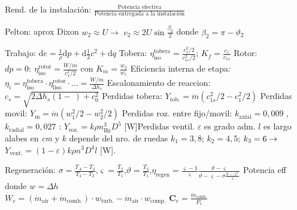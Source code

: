\newcommand{\rTc}{\varsigma}
\newcommand{\rTt}{\vartheta}
\newcommand{\Ce}{\mathbf{C}_e}

\begin{formuleo}[Turbinas]
Rend. de la instalación: $\frac{\text{Potencia efectiva}}{\text{Potencia entregada a la instalación}}$

\end{formuleo}

\begin{formuleo}[T. Hidráulicas]
Pelton: aprox Dixon $w_2\approx U\rightarrow$ $c_2 \approx 2 U \sin \frac{\beta_2}{2}$ donde $\beta_{2}=\pi-\vartheta_{2}$ \
\end{formuleo}

\begin{formuleo}[T. de Vapor]
Trabajo: $\mathrm{d} e=\frac{1}{\rho} \mathrm{d} p+\mathrm{d} \frac{1}{2} c^{2}+\mathrm{d} q$\separar
Tobera: $\eta_{\mathrm{iso}}^{\mathrm{tobera}}=\frac{c_{1}^{2} / 2}{c_{1 s}^{2} / 2}$; $K_{f}=\frac{c_{1}}{c_{1 s}}$ \separar 
Rotor: $dp=0:\ \eta_{\mathrm{iso}}^{\mathrm{rotor}}=\frac{\dot{W} / \dot{m}}{c_{1}^{2} / 2}$ con $K_{m}=\frac{w_{2}}{w_{1}}$ \separar Eficiencia interna de etapa: $\eta_{i}=\eta_{\mathrm{iso}}^{\mathrm{tobera}} \cdot \eta_{\mathrm{liso}}^{\mathrm{rotor}} \cdot \ldots=\frac{W / \dot{m}}{\Delta h_{s}}$ \separar Escalonamiento de reaccion: $c_{s}=\sqrt{2 \Delta h_{s}(1-\ )+c_{0}^{2}}$  \separar Perdidas tobera: $Y_{\mathrm{tob.}}=\dot{m}(c^2_{1s}/2-c^2_1/2)$  Perdidas movil: $Y_{\mathrm{m}} = \dot{m}(w_1^2/2 - w_2^2/2)$
Perdidas roz. entre fijo/movil: $k_{\mathrm{axial}}=0,009$ ,$k_{\mathrm{radial}}=0,027$ : $Y_{\mathrm{roz.}}=k \rho n_{\mathrm{Hz}}^{3} D^{5}$ [W]\separar Perdidas ventil. $\varepsilon$ es grado adm. $l$ es largo alabes en \emph{cm} y $k$ depende del nro. de ruedas $k_1=3,8$; $k_2=4,5$; $k_3=6 \rightarrow $ $Y_{\mathrm{vent.}}=(1-\varepsilon) k \rho n^{3} D^{4} l$ [W].
\end{formuleo}

\begin{formuleo}[T.Gas]
Regeneración: $\sigma=\frac{T_A-T_2}{T_4 - T_2}$,$\rTc = \frac{T_2}{T_1}$,$\rTt=\frac{T_3}{T_1}$,$\eta_{\mathrm{regen}} = \frac{\rTc  -1}{\rTc} \frac{\rTt-\rTc}{\rTt -\rTc - \sigma \frac{\rTt - \rTc^2}{\rTc}} $ \separar Potencia eff donde $w=\Delta h$\\ $\dot{W}_{e}=\left(\dot{m}_{\mathrm{air}}+\dot{m}_{\mathrm{comb.}}\right) \cdot w_{\mathrm{turb.}}-\dot{m}_{\mathrm{air}} \cdot w_{\mathrm{comp.}}$
\separar $\Ce = \frac{\dot{m}_{\mathrm{comb.}}}{P_e}$

\end{formuleo}

